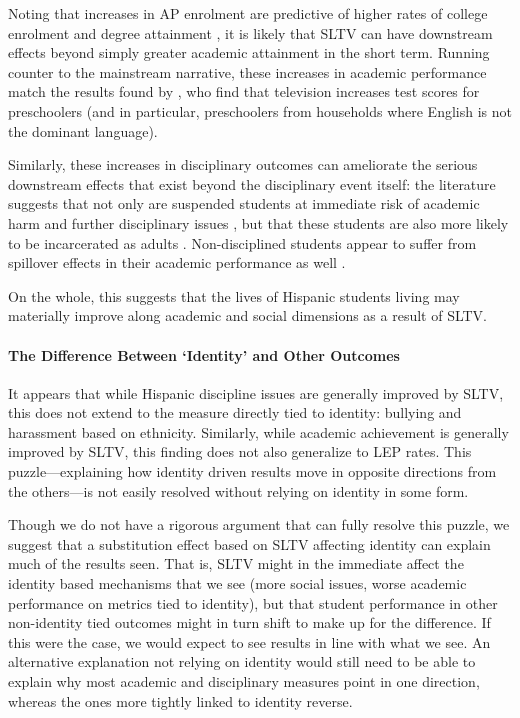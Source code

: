\documentclass[11pt]{article}
\begin{document}
Noting that increases in AP enrolment are predictive of higher rates of college enrolment and degree attainment \citep{speroni_determinants_2011}, it is likely that SLTV can have downstream effects beyond simply greater academic attainment in the short term. Running counter to the mainstream narrative, these increases in academic performance match the results found by \cite{gentzkow_preschool_2008}, who find that television increases test scores for preschoolers (and in particular, preschoolers from households where English is not the dominant language).

Similarly, these increases in disciplinary outcomes can ameliorate the serious downstream effects that exist beyond the disciplinary event itself: the literature suggests that not only are suspended students at immediate risk of academic harm and further disciplinary issues \citep{arcia_achievement_2006}, but that these students are also more likely to be incarcerated as adults  \citep{wolf_school_2017}. Non-disciplined students appear to suffer from spillover effects in their academic performance as well \citep{perry_suspending_2014}.

On the whole, this suggests that the lives of Hispanic students living may materially improve along academic and social dimensions as a result of SLTV. 

\paragraph{The Difference Between `Identity' and Other Outcomes}
It appears that while Hispanic discipline issues are generally improved by SLTV, this does not extend to the measure directly tied to identity: bullying and harassment based on ethnicity. Similarly, while academic achievement is generally improved by SLTV, this finding does not also generalize to LEP rates. This puzzle---explaining how identity driven results move in opposite directions from the others---is not easily resolved without relying on identity in some form. 

Though we do not have a rigorous argument that can fully resolve this puzzle, we suggest that a substitution effect based on SLTV affecting identity can explain much of the results seen. That is, SLTV might in the immediate affect the identity based mechanisms that we see (more social issues, worse academic performance on metrics tied to identity), but that student performance in other non-identity tied outcomes might in turn shift to make up for the difference. If this were the case, we would expect to see results in line with what we see. An alternative explanation not relying on identity would still need to be able to explain why most academic and disciplinary measures point in one direction, whereas the ones more tightly linked to identity reverse.
\end{document}
